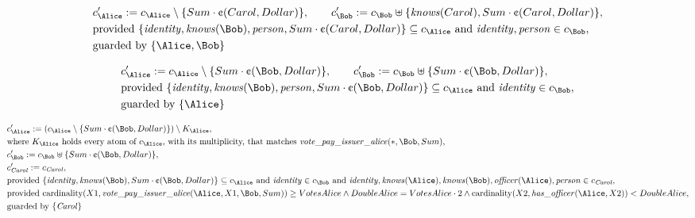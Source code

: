 \begin{align*}
&
c'_
{
\Alice
}
 := 
c_
{
\Alice
}
 \setminus 
\{
Sum
\cdot
\text{\textcent}
(
Carol
,
Dollar
)
\}
, \qquad 
c'_
{
\Bob
}
 := 
c_
{
\Bob
}
 \uplus 
\{
\mathit{\detokenize{
knows
}}
(
Carol
)
,
Sum
\cdot
\text{\textcent}
(
Carol
,
Dollar
)
\}
,\\
&
\text{provided } 
\{
\mathit{\detokenize{
identity
}}
,
\mathit{\detokenize{
knows
}}
(
\Bob
)
,
\mathit{\detokenize{
person
}}
,
Sum
\cdot
\text{\textcent}
(
Carol
,
Dollar
)
\}
 \subseteq c_
{
\Alice
}
 \text{ and } 
\mathit{\detokenize{
identity
}}
,
\mathit{\detokenize{
person
}}
 \in c_
{
\Bob
}
,\\
&
\text{guarded by } \{
\Alice
,
\Bob
\}
\end{align*}

\begin{align*}
&
c'_
{
\Alice
}
 := 
c_
{
\Alice
}
 \setminus 
\{
Sum
\cdot
\text{\textcent}
(
\Bob
,
Dollar
)
\}
, \qquad 
c'_
{
\Bob
}
 := 
c_
{
\Bob
}
 \uplus 
\{
Sum
\cdot
\text{\textcent}
(
\Bob
,
Dollar
)
\}
,\\
&
\text{provided } 
\{
\mathit{\detokenize{
identity
}}
,
\mathit{\detokenize{
knows
}}
(
\Bob
)
,
\mathit{\detokenize{
person
}}
,
Sum
\cdot
\text{\textcent}
(
\Bob
,
Dollar
)
\}
 \subseteq c_
{
\Alice
}
 \text{ and } 
\mathit{\detokenize{
identity
}}
 \in c_
{
\Bob
}
,\\
&
\text{guarded by } \{
\Alice
\}
\end{align*}

\begin{align*}
&
c'_
{
\Alice
}
 := 
(c_
{
\Alice
}
 \setminus 
\{
Sum
\cdot
\text{\textcent}
(
\Bob
,
Dollar
)
\}
) \setminus K_
{
\Alice
}
,\\
&
\text{where } K_
{
\Alice
}
 \text{ holds every atom of } c_
{
\Alice
}
 \text{, with its multiplicity, that matches } 
\mathit{\detokenize{
vote_pay_issuer_alice
}}
(
\ast
,
\Bob
,
Sum
)
,\\
&
c'_
{
\Bob
}
 := 
c_
{
\Bob
}
 \uplus 
\{
Sum
\cdot
\text{\textcent}
(
\Bob
,
Dollar
)
\}
,\\
&
c'_
{
\mathit{Carol}
}
 := 
c_
{
\mathit{Carol}
}
,\\
&
\text{provided } 
\{
\mathit{\detokenize{
identity
}}
,
\mathit{\detokenize{
knows
}}
(
\Bob
)
,
Sum
\cdot
\text{\textcent}
(
\Bob
,
Dollar
)
\}
 \subseteq c_
{
\Alice
}
 \text{ and } 
\mathit{\detokenize{
identity
}}
 \in c_
{
\Bob
}
 \text{ and } 
\mathit{\detokenize{
identity
}}
,
\mathit{\detokenize{
knows
}}
(
\Alice
)
,
\mathit{\detokenize{
knows
}}
(
\Bob
)
,
\mathit{\detokenize{
officer
}}
(
\Alice
)
,
\mathit{\detokenize{
person
}}
 \in c_
{
\mathit{Carol}
}
,\\
&
\text{provided } 
\mathrm{cardinality}(
X1
,
\mathit{\detokenize{
vote_pay_issuer_alice
}}
(
\Alice
,
X1
,
\Bob
,
Sum
)
)
\ge
VotesAlice
\land
DoubleAlice
=
VotesAlice
\cdot
2
\land
\mathrm{cardinality}(
X2
,
\mathit{\detokenize{
has_officer
}}
(
\Alice
,
X2
)
)
<
DoubleAlice
,\\
&
\text{guarded by } \{
\mathit{Carol}
\}
\end{align*}
